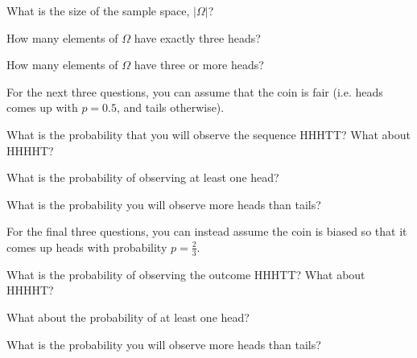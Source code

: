 \documentclass[11pt]{article}
\begin{document}
\begin{Parts}
\Part What is the size of the sample space, $|\Omega|$?

\Part How many elements of $\Omega$ have exactly three heads?

\Part How many elements of $\Omega$ have three or more heads?
\end{Parts}

For the next three questions, you can assume that the coin is fair (i.e. heads comes up with $p=0.5$, and tails otherwise).

\begin{ResumeParts}
\Part What is the probability that you will observe the sequence HHHTT? What about HHHHT?

\Part What is the probability of observing at least one head?

\Part What is the probability you will observe more heads than tails?

\end{ResumeParts}

For the final three questions, you can instead assume the coin is biased so that it comes up heads with probability $p = \frac{2}{3}$.

\begin{ResumeParts}
\Part What is the probability of observing the outcome HHHTT? What about HHHHT?

\Part What about the probability of at least one head?

\Part What is the probability you will observe more heads than tails?
\end{ResumeParts}
\end{document}
